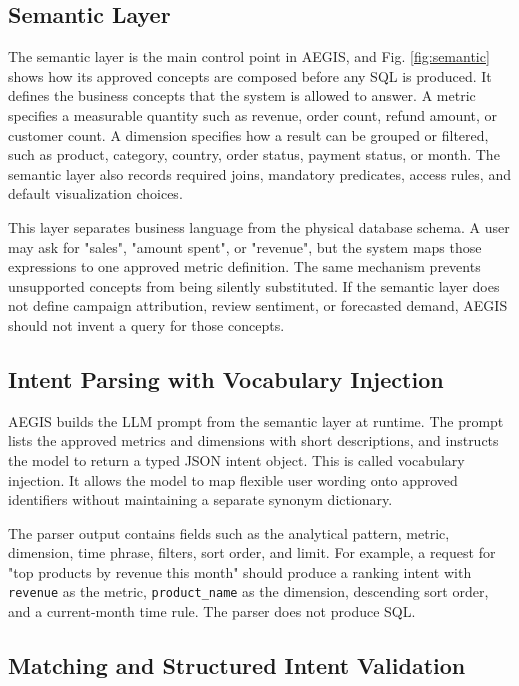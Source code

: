 \documentclass[pdflatex,sn-mathphys-num]{sn-jnl}
\begin{document}
\subsection{Semantic Layer}

The semantic layer is the main control point in AEGIS, and Fig. \ref{fig:semantic} shows how its approved concepts are composed before any SQL is produced. It defines the business concepts that the system is allowed to answer. A metric specifies a measurable quantity such as revenue, order count, refund amount, or customer count. A dimension specifies how a result can be grouped or filtered, such as product, category, country, order status, payment status, or month. The semantic layer also records required joins, mandatory predicates, access rules, and default visualization choices.


This layer separates business language from the physical database schema. A user may ask for "sales", "amount spent", or "revenue", but the system maps those expressions to one approved metric definition. The same mechanism prevents unsupported concepts from being silently substituted. If the semantic layer does not define campaign attribution, review sentiment, or forecasted demand, AEGIS should not invent a query for those concepts.


\subsection{Intent Parsing with Vocabulary Injection}

AEGIS builds the LLM prompt from the semantic layer at runtime. The prompt lists the approved metrics and dimensions with short descriptions, and instructs the model to return a typed JSON intent object. This is called vocabulary injection. It allows the model to map flexible user wording onto approved identifiers without maintaining a separate synonym dictionary.


The parser output contains fields such as the analytical pattern, metric, dimension, time phrase, filters, sort order, and limit. For example, a request for "top products by revenue this month" should produce a ranking intent with \texttt{revenue} as the metric, \texttt{product\_name} as the dimension, descending sort order, and a current-month time rule. The parser does not produce SQL.


\subsection{Matching and Structured Intent Validation}
\end{document}
